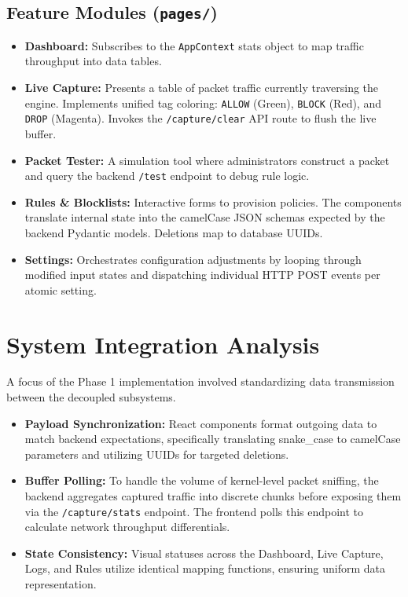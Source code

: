 \documentclass[12pt, a4paper]{article}
\begin{document}
\subsection{Feature Modules (\texttt{pages/})}
\begin{itemize}
    \item \textbf{Dashboard:} Subscribes to the \texttt{AppContext} stats object to map traffic throughput into data tables.
    \item \textbf{Live Capture:} Presents a table of packet traffic currently traversing the engine. Implements unified tag coloring: \texttt{ALLOW} (Green), \texttt{BLOCK} (Red), and \texttt{DROP} (Magenta). Invokes the \texttt{/capture/clear} API route to flush the live buffer.
    \item \textbf{Packet Tester:} A simulation tool where administrators construct a packet and query the backend \texttt{/test} endpoint to debug rule logic.
    \item \textbf{Rules \& Blocklists:} Interactive forms to provision policies. The components translate internal state into the camelCase JSON schemas expected by the backend Pydantic models. Deletions map to database UUIDs.
    \item \textbf{Settings:} Orchestrates configuration adjustments by looping through modified input states and dispatching individual HTTP POST events per atomic setting.
\end{itemize}

\section{System Integration Analysis}
A focus of the Phase 1 implementation involved standardizing data transmission between the decoupled subsystems.
\begin{itemize}
    \item \textbf{Payload Synchronization:} React components format outgoing data to match backend expectations, specifically translating snake\_case to camelCase parameters and utilizing UUIDs for targeted deletions.
    \item \textbf{Buffer Polling:} To handle the volume of kernel-level packet sniffing, the backend aggregates captured traffic into discrete chunks before exposing them via the \texttt{/capture/stats} endpoint. The frontend polls this endpoint to calculate network throughput differentials.
    \item \textbf{State Consistency:} Visual statuses across the Dashboard, Live Capture, Logs, and Rules utilize identical mapping functions, ensuring uniform data representation.
\end{itemize}
\end{document}
